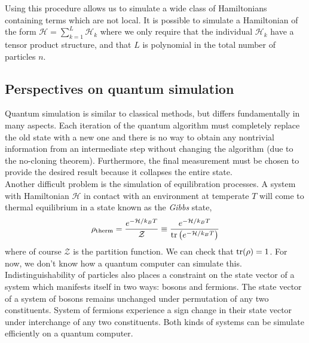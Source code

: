\documentclass{book}
\theoremstyle{definition}
\newcommand{\had}{\mathcal{H}}
\newcommand{\f}[2]{\frac{#1}{#2}}
\newcommand{\lp}{\left(}
\newcommand{\rp}{\right)}
\begin{document}
Using this procedure allows us to simulate a wide class of Hamiltonians containing terms which are not local. It is possible to simulate a Hamiltonian of the form $\had = \sum^L_{k=1} \had_k$ where we only require that the individual $\had_k$ have a tensor product structure, and that $L$ is polynomial in the total number of particles $n$. 







\subsection{Perspectives on quantum simulation}

 
Quantum simulation is similar to classical methods, but differs fundamentally in many aspects. Each iteration of the quantum algorithm must completely replace the old state with a new one and there is no way to obtain any nontrivial information from an intermediate step without changing the algorithm (due to the no-cloning theorem). Furthermore, the final measurement must be chosen to provide the desired result because it collapses the entire state. \\

Another difficult problem is the simulation of equilibration processes. A system with Hamiltonian $\had$ in contact with an environment at temperate $T$ will come to thermal equilibrium in a state known as the \textit{Gibbs} state,
\begin{align}
\rho_{\text{therm}} = \f{e^{-\had/k_BT}}{\mathcal{Z}} \equiv \f{e^{-\had/k_BT}}{\tr\lp e^{-\had/k_BT} \rp}
\end{align}
where of course $\mathcal{Z}$ is the partition function. We can check that $\tr(\rho) = 1$. For now, we don't know how a quantum computer can simulate this. \\

Indistinguishability of particles also places a constraint on the state vector of a system which manifests itself in two ways: bosons and fermions. The state vector of a system of bosons remains unchanged under permutation of any two constituents. System of fermions experience a sign change in their state vector under interchange of any two constituents. Both kinds of systems can be simulate efficiently on a quantum computer. 
\end{document}
